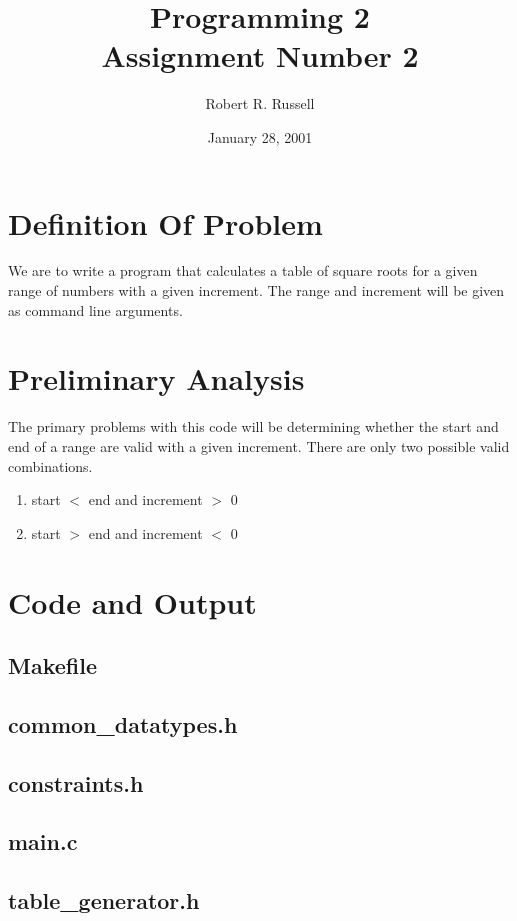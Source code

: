 \documentclass[letterpaper,oneside]{scrartcl}
\title{Programming 2\\Assignment Number 2}
\author{Robert R. Russell}
\date{January 28, 2001}
\begin{document}
\maketitle

\section{Definition Of Problem}
We are to write a program that calculates a table of square roots for
a given range of numbers with a given increment. The range and increment will be
given as command line arguments.

\section{Preliminary Analysis}
The primary problems with this code will be determining whether the start and
end of a range are valid with a given increment. There are only two possible
valid combinations.
\begin{enumerate}
\item start $<$ end and increment $>$ 0
\item start $>$ end and increment $<$ 0
\end{enumerate}

\newpage 
\section{Code and Output}

\subsection{Makefile}

\subsection{common\_datatypes.h}

\subsection{constraints.h}

\newpage
\subsection{main.c}

\subsection{table\_generator.h}
\end{document}

